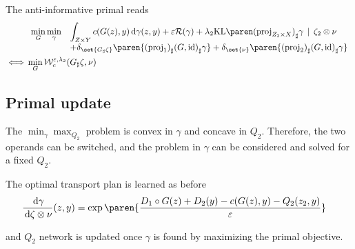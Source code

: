 \documentclass[11pt,a4paper]{article}
\begin{document}
The anti-informative primal reads
\begin{align}
    \label{eqn:anti-info-rotgan}
&\begin{array}{*2{>{\displaystyle}l}}
    \min_{G} \min_{\gamma}  &\int_{\ZY}{ c(G(z), y) \d \gamma(z, y)}  + \eps \R(\gamma)
    + \lambda_2 \KL{\pf{(\projZBX)}{\gamma}}{\oprod{\zeta_2}{\nu}}\\
                            &+ \delta_{\set{\pf{G}{\zeta}}}\paren{\pf{( \proj{1} )}{\pf{(G, \id)}{\gamma}}} + \delta_{\set{\nu}}\paren{\pf{( \proj{2} )}{\pf{(G, \id)}{\gamma}}}
\end{array} \\
    \iff & \min_{G} \Wace(\pf{G}{\zeta}, \nu)
\end{align}

\subsection{Primal update}

The $\min_{\gamma}\max_{Q_2}$ problem is convex in $\gamma$ and concave in $Q_2$. Therefore, the two operands can be switched, and the problem in $\gamma$ can be considered and solved for a fixed $Q_2$.

The optimal transport plan is learned as before
\begin{align}
    \label{eqn:primal-dual-info-rotgan}
    \radon{\gamma}{\zetaxnu}(z,y)
                      &=\exp\paren{\frac{D_1 \circ G(z) + D_2(y) - c(G(z), y) - Q_2(z_2, y)}{\eps}}
\end{align}

and $Q_2$ network is updated once $\gamma$ is found by maximizing the primal objective.
\end{document}
